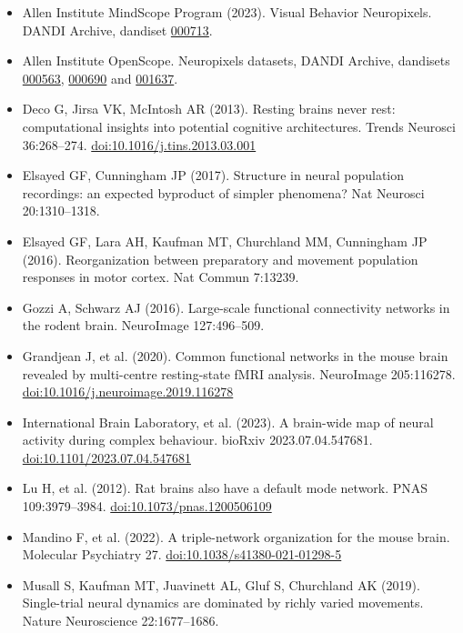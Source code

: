 \documentclass[10pt,a4paper]{article}
\begin{document}
\begin{itemize}
\item Allen Institute MindScope Program (2023). Visual Behavior Neuropixels. DANDI Archive, dandiset \href{https://dandiarchive.org/dandiset/000713}{000713}.
\item Allen Institute OpenScope. Neuropixels datasets, DANDI Archive, dandisets \href{https://dandiarchive.org/dandiset/000563}{000563}, \href{https://dandiarchive.org/dandiset/000690}{000690} and \href{https://dandiarchive.org/dandiset/001637}{001637}.
\item Deco G, Jirsa VK, McIntosh AR (2013). Resting brains never rest: computational insights into potential cognitive architectures. Trends Neurosci 36:268--274. \href{https://doi.org/10.1016/j.tins.2013.03.001}{doi:10.1016/j.tins.2013.03.001}
\item Elsayed GF, Cunningham JP (2017). Structure in neural population recordings: an expected byproduct of simpler phenomena? Nat Neurosci 20:1310--1318.
\item Elsayed GF, Lara AH, Kaufman MT, Churchland MM, Cunningham JP (2016). Reorganization between preparatory and movement population responses in motor cortex. Nat Commun 7:13239.
\item Gozzi A, Schwarz AJ (2016). Large-scale functional connectivity networks in the rodent brain. NeuroImage 127:496--509.
\item Grandjean J, et al. (2020). Common functional networks in the mouse brain revealed by multi-centre resting-state fMRI analysis. NeuroImage 205:116278. \href{https://doi.org/10.1016/j.neuroimage.2019.116278}{doi:10.1016/j.neuroimage.2019.116278}
\item International Brain Laboratory, et al. (2023). A brain-wide map of neural activity during complex behaviour. bioRxiv 2023.07.04.547681. \href{https://doi.org/10.1101/2023.07.04.547681}{doi:10.1101/2023.07.04.547681}
\item Lu H, et al. (2012). Rat brains also have a default mode network. PNAS 109:3979--3984. \href{https://doi.org/10.1073/pnas.1200506109}{doi:10.1073/pnas.1200506109}
\item Mandino F, et al. (2022). A triple-network organization for the mouse brain. Molecular Psychiatry 27. \href{https://doi.org/10.1038/s41380-021-01298-5}{doi:10.1038/s41380-021-01298-5}
\item Musall S, Kaufman MT, Juavinett AL, Gluf S, Churchland AK (2019). Single-trial neural dynamics are dominated by richly varied movements. Nature Neuroscience 22:1677--1686.

\end{itemize}
\end{document}
